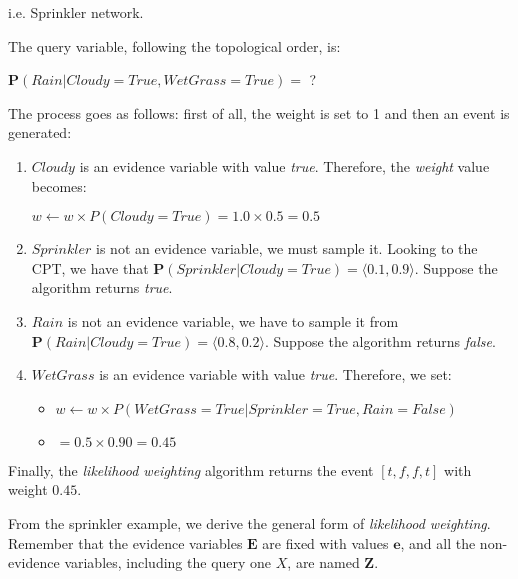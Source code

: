 \begin{example}
    i.e. Sprinkler network. \vspace{3.5pt}

    The query variable, following the topological order, is: \vspace{3.5pt}
    \begin{center}
        $\mathbf{P}(Rain|Cloudy=True, WetGrass=True) =$ ?
    \end{center} \vspace{3.5pt}
    The process goes as follows: first of all, the weight is set to 1 and then an event is generated:
    \begin{enumerate}
        \item $Cloudy$ is an evidence variable with value \textit{true}. Therefore, the \textit{weight} value becomes: \vspace{3.5pt}
        \begin{center}
            $w \leftarrow w \times P(Cloudy=True) = 1.0 \times 0.5 = 0.5$
        \end{center} \vspace{3.5pt}
        \item $Sprinkler$ is not an evidence variable, we must sample it. Looking to the CPT, we have that $\mathbf{P}(Sprinkler|Cloudy=True) = \langle0.1, 0.9\rangle$. Suppose the algorithm returns \textit{true}.
        \item $Rain$ is not an evidence variable, we have to sample it from $\mathbf{P}(Rain|Cloudy=True) = \langle0.8, 0.2\rangle$. Suppose the algorithm returns \textit{false}.
        \item $WetGrass$ is an evidence variable with value \textit{true}. Therefore, we set: \vspace{3.5pt}
        \begin{itemize}
            \renewcommand{\labelitemi}{}
            \item $w \leftarrow w \times P(WetGrass=True|Sprinkler=True,Rain=False)$
            \item $= 0.5 \times 0.90 = 0.45$
        \end{itemize}
    \end{enumerate} \vspace{3.5pt}
    Finally, the \textit{likelihood weighting} algorithm returns the event $[t,f,f,t]$ with weight $0.45$.
\end{example}
From the sprinkler example, we derive the general form of \textit{likelihood weighting}. Remember that the evidence variables $\mathbf{E}$ are fixed with values $\mathbf{e}$,
and all the non-evidence variables, including the query one $X$, are named $\mathbf{Z}$. \vspace{3.5pt}

